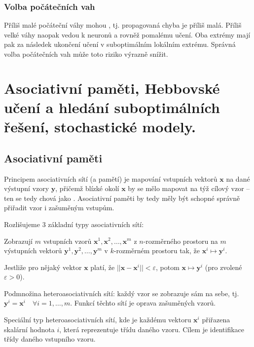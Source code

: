 \documentclass[11pt]{report} %
\renewcommand{\vec}[1]{\mathbf{#1}}
\begin{document}
\subsubsection{Volba počátečních vah}
Příliš malé počáteční váhy mohou , tj. propagovaná chyba je příliš malá. Příliš velké váhy naopak vedou k  neuronů a rovněž pomalému učení. Oba extrémy mají pak za následek ukončení učení v suboptimálním lokálním extrému. Správná volba počátečních vah může toto riziko výrazně snížit.

\section{Asociativní paměti, Hebbovské učení a hledání suboptimálních řešení, stochastické modely.}
\subsection{Asociativní paměti}
Principem asociativních sítí (a pamětí) je mapování vstupních vektorů $\vec{x}$ na dané výstupní vzory $\vec{y}$, přičemž blízké okolí $\vec{x}$ by se mělo mapovat na týž cílový vzor -- ten se tedy chová jako . Asociativní paměti by tedy měly být schopné správně přiřadit vzor i zašuměným vstupům. 

Rozlišujeme 3 základní typy asociativních sítí:
\begin{description}
	\leftskip 40pt
	\setlength{\itemsep}{0pt}
	\item[heteroasociativní sítě] Zobrazují $m$ vstupních vzorů $\vec{x}^1, \vec{x}^2, \dots, \vec{x}^m$ z $n$-rozměrného prostoru na $m$ výstupních vektorů $\vec{y}^1, \vec{y}^2, \dots, \vec{y}^m$ v $k$-rozměrném prostoru tak, že $\vec{x}^i \mapsto \vec{y}^i$. 
	
	Jestliže pro nějaký vektor $\vec{x}$ platí, že $||\vec{x} - \vec{x}^i|| < \varepsilon$, potom $\vec{x} \mapsto \vec{y}^i$ (pro zvolené $\varepsilon > 0$).
	
	\item[autoasociativní sítě] Podmnožina heteroasociativních sítí: každý vzor se zobrazuje 
	sám na sebe, tj. $\vec{y}^i = \vec{x}^i \quad \forall i = 1, \dots, m$. Funkcí těchto sítí je oprava zašuměných vzorů.
	
	\item[sítě pro rozpoznávání vzorů] Speciální typ heteroasociativních sítí, kde je každému vektoru $\vec{x}^i$ přiřazena skalární hodnota $i$, která reprezentuje třídu daného vzoru. Cílem je identifikace třídy daného vstupního vzoru.
\end{description}
\end{document}
